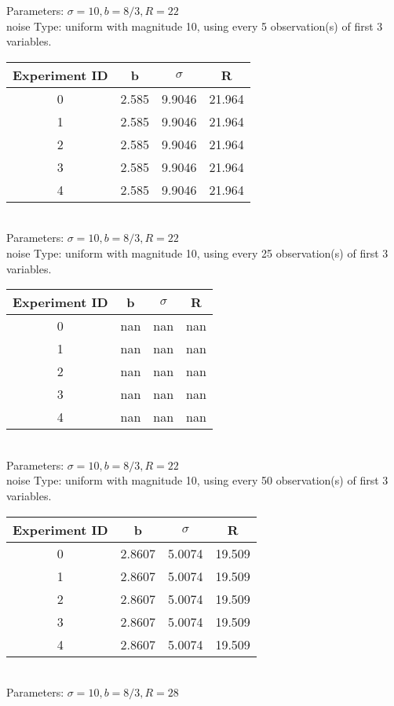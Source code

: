 \begin{multicols}{3}
Parameters: $\sigma=10, b=8/3, R=22$\\
noise Type: uniform with magnitude 10, using every 5 observation(s) of first 3 variables.\\
\begin{tabular}{cccc}
\hline Experiment ID & b & $\sigma$ & R \\ \hline 
0 & 2.585 & 9.9046 & 21.964\\ \hline 
 1 & 2.585 & 9.9046 & 21.964\\ \hline 
 2 & 2.585 & 9.9046 & 21.964\\ \hline 
 3 & 2.585 & 9.9046 & 21.964\\ \hline 
 4 & 2.585 & 9.9046 & 21.964\\ \hline 
 \end{tabular}\\
Parameters: $\sigma=10, b=8/3, R=22$\\
noise Type: uniform with magnitude 10, using every 25 observation(s) of first 3 variables.\\
\begin{tabular}{cccc}
\hline Experiment ID & b & $\sigma$ & R \\ \hline 
0 & nan & nan & nan\\ \hline 
 1 & nan & nan & nan\\ \hline 
 2 & nan & nan & nan\\ \hline 
 3 & nan & nan & nan\\ \hline 
 4 & nan & nan & nan\\ \hline 
 \end{tabular}\\
Parameters: $\sigma=10, b=8/3, R=22$\\
noise Type: uniform with magnitude 10, using every 50 observation(s) of first 3 variables.\\
\begin{tabular}{cccc}
\hline Experiment ID & b & $\sigma$ & R \\ \hline 
0 & 2.8607 & 5.0074 & 19.509\\ \hline 
 1 & 2.8607 & 5.0074 & 19.509\\ \hline 
 2 & 2.8607 & 5.0074 & 19.509\\ \hline 
 3 & 2.8607 & 5.0074 & 19.509\\ \hline 
 4 & 2.8607 & 5.0074 & 19.509\\ \hline 
 \end{tabular}\\
Parameters: $\sigma=10, b=8/3, R=28$\\

\end{multicols}
